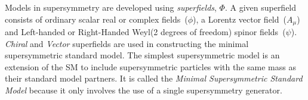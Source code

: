 {Models in supersymmetry are developed using \textit{superfields}, \textbf{$\Phi$}. A given superfield consists of
ordinary scalar real or complex fields~($\phi$), a Lorentz vector field~($ A_{\mu} $) and Left-handed or Right-Handed Weyl(2 degrees of freedom) spinor fields~($\psi$). \textit{Chiral} and \textit{Vector} superfields are used in constructing the minimal supersymmetric standard model.
The simplest supersymmetric model is an extension of the SM to include supersymmetric particles with the same mass
as their standard model partners. It is called the \textit{Minimal Supersymmetric Standard Model} because it only involves the 
use of a single supersymmetry generator.

}
